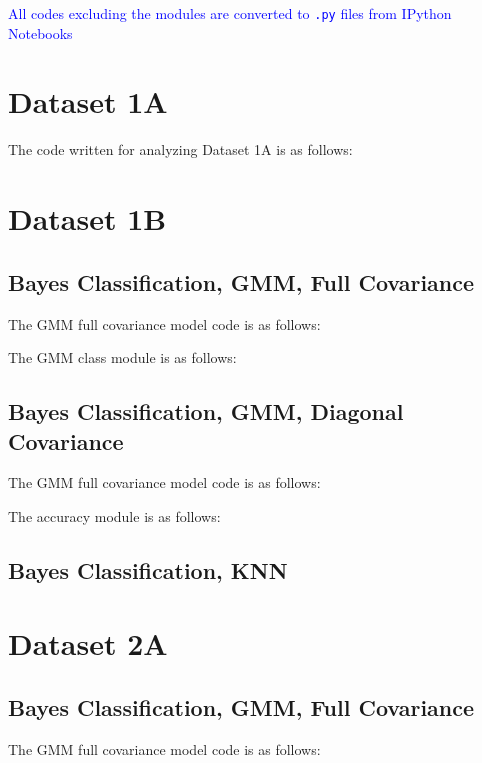 \documentclass[11pt,a4paper]{article}
\newcommand{\noi}{\noindent}
\def\tt#1{\texttt{#1}}
\begin{document}
{\hypersetup{linkcolor=black}
 \tableofcontents}
\break

\noi
\textcolor{blue}{All codes excluding the modules are converted to \tt{.py} files from IPython Notebooks}
\section{Dataset 1A}
The code written for analyzing Dataset 1A is as follows:\vspace{-1em}


\section{Dataset 1B}
\subsection{Bayes Classification, GMM, Full Covariance}
The GMM full covariance model code is as follows: \vspace{-1em}


\noi
The GMM class module is as follows:\vspace{-1em}


\subsection{Bayes Classification, GMM, Diagonal Covariance}
The GMM full covariance model code is as follows: \vspace{-1em}


\noi
The accuracy module is as follows:\vspace{-1em}


\subsection{Bayes Classification, KNN}


\section{Dataset 2A}
\subsection{Bayes Classification, GMM, Full Covariance}
The GMM full covariance model code is as follows: \vspace{-1em}

\end{document}
